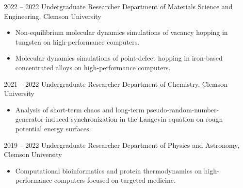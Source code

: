 \documentclass[9pt]{developercv} %
\begin{document}
\begin{entrylist}
{        }
    \entry
		{2022 -- 2022}
		{Undergraduate Researcher}
		{Department of Materials Science and Engineering, Clemson University}
		{\vspace{-10pt}
        \begin{itemize}[noitemsep,topsep=0pt,parsep=0pt,partopsep=0pt, leftmargin=-1pt]
            \item Non-equilibrium molecular dynamics simulations of vacancy hopping in tungsten on high-performance computers.
            \item Molecular dynamics simulations of point-defect hopping in iron-based concentrated alloys on high-performance computers.
        \end{itemize} 
        }
    \entry
		{2021 -- 2022}
		{Undergraduate Researcher}
		{Department of Chemistry, Clemson University}
		{\vspace{-10pt}
        \begin{itemize}[noitemsep,topsep=0pt,parsep=0pt,partopsep=0pt, leftmargin=-1pt]
            \item Analysis of short-term chaos and long-term pseudo-random-number-generator-induced synchronization in the Langevin equation on rough potential energy surfaces.
        \end{itemize} 
        }
    \entry
		{2019 -- 2022}
		{Undergraduate Researcher}
		{Department of Physics and Astronomy, Clemson University}
		{\vspace{-10pt}
        \begin{itemize}[noitemsep,topsep=0pt,parsep=0pt,partopsep=0pt, leftmargin=-1pt]
            \item Computational bioinformatics and protein thermodynamics on high-performance computers focused on targeted medicine.
        \end{itemize}
        }
\end{entrylist}
\end{document}
